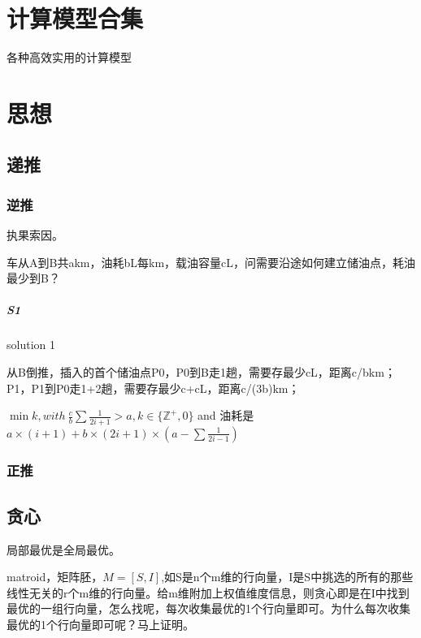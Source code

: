 \documentclass[UTF8]{../computerUniverse}
\begin{document}
\chapter{计算模型合集}
各种高效实用的计算模型







\chapter{思想}

\section{递推}

\subsection{逆推}
执果索因。


\begin{question}
 车从A到B共akm，油耗bL每km，载油容量cL，问需要沿途如何建立储油点，耗油最少到B？

  \paragraph{S1} solution 1

  从B倒推，插入的首个储油点P0，P0到B走1趟，需要存最少cL，距离c/bkm；
  P1，P1到P0走1+2趟，需要存最少c+cL，距离c/(3b)km；



  $\min k, with \ \frac{c}{b}\sum\frac{1}{2i+1} > a, k\in \{ \mathbb{Z} ^+, 0\}$ and 油耗是$a \times (i+1) + b \times(2i+1) \times (a - \sum\frac{1}{2i-1})$

\end{question}

\subsection{正推}

\section{贪心}

局部最优是全局最优。



matroid，矩阵胚，$M = [S,I]$,如S是n个m维的行向量，I是S中挑选的所有的那些线性无关的r个m维的行向量。给m维附加上权值维度信息，则贪心即是在I中找到最优的一组行向量，怎么找呢，每次收集最优的1个行向量即可。为什么每次收集最优的1个行向量即可呢？马上证明。
\end{document}
